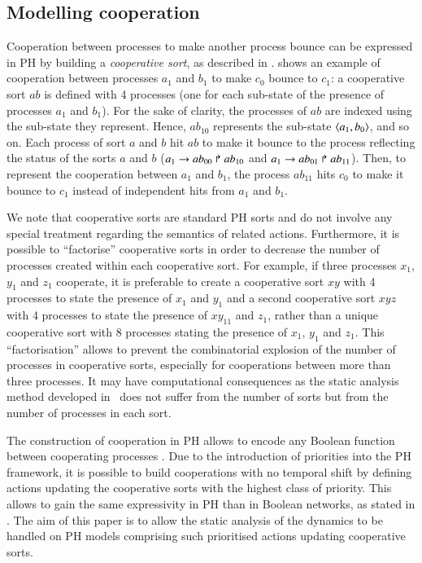\begin{example}
\end{example}



\subsection{Modelling cooperation}
\label{ssec:cooperation}

Cooperation between processes to make another process bounce can be expressed in PH by building a \emph{cooperative sort}, as described in \cite{PMR10-TCSB}.
 shows an example of cooperation between processes $a_1$ and $b_1$ to make $c_0$ bounce to $c_1$:
a cooperative sort $ab$ is defined with 4 processes (one for each sub-state of the presence of processes $a_1$ and $b_1$).
For the sake of clarity, the processes of $ab$ are indexed using the sub-state they represent.
Hence, $ab_{10}$ represents the sub-state $\mbox{$\langle a_1,b_0 \rangle$}$, and so on.
Each process of sort $a$ and $b$ hit $ab$ to make it bounce to the process reflecting the status of the sorts $a$ and $b$
(\eg $a_1\rightarrow ab_{00}\Rsh ab_{10}$ and $a_1\rightarrow ab_{01}\Rsh ab_{11}$).
Then, to represent the cooperation between $a_1$ and $b_1$, the process $ab_{11}$ hits $c_0$ to make it bounce to $c_1$ instead of independent hits from $a_1$ and $b_1$.

We note that cooperative sorts are standard PH sorts and do not involve any
special treatment regarding the semantics of related actions.
Furthermore, it is possible to “factorise” cooperative sorts in order to decrease the number of processes created within each cooperative sort.
For example, if three processes $x_1$, $y_1$ and $z_1$ cooperate,
it is preferable to create a cooperative sort $xy$ with 4 processes to state the presence of $x_1$ and $y_1$
and a second cooperative sort $xyz$ with 4 processes to state the presence of $xy_{11}$ and $z_1$,
rather than a unique cooperative sort with 8 processes stating the presence of $x_1$, $y_1$ and $z_1$.
This “factorisation” allows to prevent the combinatorial explosion of the number of processes in cooperative sorts,
especially for cooperations between more than three processes.
It may have computational consequences as the static analysis method developed in~ does not suffer from the number of sorts but from the number of processes in each sort.

The construction of cooperation in PH allows to encode any Boolean function between cooperating processes \cite{PMR10-TCSB}.
Due to the introduction of priorities into the PH framework,
it is possible to build cooperations with no temporal shift by defining actions updating the cooperative sorts with the highest class of priority.
This allows to gain the same expressivity in PH than in Boolean networks, as stated in .
The aim of this paper is to allow the static analysis of the dynamics to be handled on PH models comprising such prioritised actions updating cooperative sorts.



